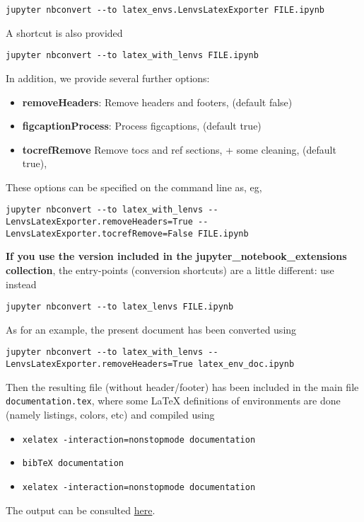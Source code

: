\begin{verbatim}
jupyter nbconvert --to latex_envs.LenvsLatexExporter FILE.ipynb
\end{verbatim}

A shortcut is also provided

\begin{verbatim}
jupyter nbconvert --to latex_with_lenvs FILE.ipynb
\end{verbatim}

In addition, we provide several further options:

\begin{itemize}
\tightlist
\item
  \textbf{removeHeaders}: Remove headers and footers, (default false)
\item
  \textbf{figcaptionProcess}: Process figcaptions, (default true)
\item
  \textbf{tocrefRemove} Remove tocs and ref sections, + some cleaning,
  (default true),
\end{itemize}

These options can be specified on the command line as, eg,

\begin{verbatim}
jupyter nbconvert --to latex_with_lenvs --LenvsLatexExporter.removeHeaders=True -- LenvsLatexExporter.tocrefRemove=False FILE.ipynb
\end{verbatim}

\textbf{If you use the version included in the
jupyter\_notebook\_extensions collection}, the entry-points (conversion
shortcuts) are a little different: use instead

\begin{verbatim}
jupyter nbconvert --to latex_lenvs FILE.ipynb
\end{verbatim}

    \begin{example} As for an example, the present document has
been converted using

\begin{verbatim}
jupyter nbconvert --to latex_with_lenvs --LenvsLatexExporter.removeHeaders=True latex_env_doc.ipynb
\end{verbatim}

Then the resulting file (without header/footer) has been included in the
main file \texttt{documentation.tex}, where some LaTeX definitions of
environments are done (namely listings, colors, etc) and compiled using

\begin{itemize}
\tightlist
\item
  \texttt{xelatex\ -interaction=nonstopmode\ documentation}
\item
  \texttt{bibTeX\ documentation}
\item
  \texttt{xelatex\ -interaction=nonstopmode\ documentation}
\end{itemize}

The output can be consulted \href{documentation.pdf}{here}.\\
\end{example}

